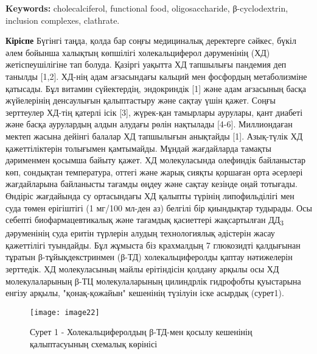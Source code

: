 {\bfseries Keywords:} cholecalciferol, functional food, oligosaccharide,
β-cyclodextrin, inclusion complexes, clathrate.

\begin{multicols}{2}
{\bfseries Кіріспе} Бүгінгі таңда, қолда бар соңғы медициналық деректерге
сәйкес, бүкіл әлем бойынша халықтың көпшілігі холекальциферол
дәруменінің (ХД) жетіспеушілігіне тап болуда. Қазіргі уақытта ХД
тапшылығы пандемия деп танылды {[}1,2{]}. ХД-нің адам ағзасындағы
кальций мен фосфордың метаболизміне қатысады. Бұл витамин сүйектердің,
эндокриндік {[}1{]} және адам ағзасының басқа жүйелерінің денсаулығын
қалыптастыру және сақтау үшін қажет. Соңғы зерттеулер ХД-тің қатерлі
ісік {[}3{]}, жүрек-қан тамырлары аурулары, қант диабеті және басқа
аурулардың алдын алудағы рөлін нақтылады {[}4-6{]}. Миллиондаған мектеп
жасына дейінгі балалар ХД тапшылығын анықтайды {[}1{]}. Азық-түлік ХД
қажеттіліктерін толығымен қамтымайды. Мұндай жағдайларда тамақты
дәрименмен қосымша байыту қажет. ХД молекуласында олефиндік байланыстар
көп, сондықтан температура, оттегі және жарық сияқты қоршаған орта
әсерлері жағдайларына байланысты тағамды өңдеу және сақтау кезінде оңай
тотығады. Өндіріс жағдайында су ортасындағы ХД қалыпты түрінің липофильділігі мен суда төмен ерігіштігі
(1 мг/100 мл-ден аз) белгілі бір қиындықтар тудырады. Осы себепті
биофармацевтикалық және тағамдық қасиеттері жақсартылған
ДД\textsubscript{3} дәруменінің суда еритін түрлерін алудың
технологиялық әдістерін жасау қажеттілігі туындайды. Бұл жұмыста біз
крахмалдың 7 глюкозидті қалдығынан тұратын β-тұйықдекстринмен (β-ТД)
холекальциферолды қаптау нәтижелерін зерттедік. ХД молекуласының майлы
ерітіндісін қолдану арқылы осы ХД молекулаларының β-ТЦ молекулаларының
цилиндрлік гидрофобты қуыстарына енгізу арқылы, "қонақ-қожайын"
кешенінің түзілуін іске асырдық (сурет1).
\end{multicols}

\begin{figure}[H]
  \centering
  \texttt{[image: image22]}
  \caption*{Сурет 1 - Холекальциферолдың β-ТД-мен қосылу кешенінің қалыптасуының схемалық көрінісі}
\end{figure}


